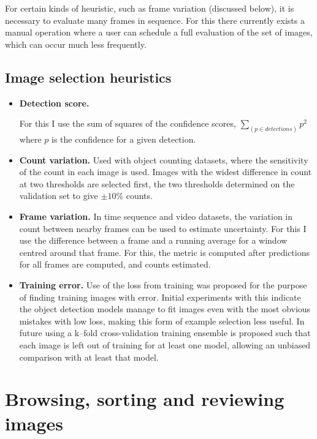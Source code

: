 For certain kinds of heuristic, such as frame variation (discussed below), it is necessary to evaluate many frames in sequence. For this there currently exists a manual operation where a user can schedule a full evaluation of the set of images, which can occur much less frequently.


\subsection {Image selection heuristics}
\begin{itemize}
\item {\bf Detection score. }

For this I use the sum of squares of the confidence scores, $ \sum_(p \in detections){ p^2 } $ where $p$ is the confidence for a given detection. 

    \item {\bf Count variation. }
Used with object counting datasets, where the sensitivity of the count in each image is used. Images with the widest difference in count at two thresholds are selected first, the two thresholds determined on the validation set to give $ \pm 10\% $ counts.
    \item {\bf Frame variation. } 
In time sequence and video datasets, the variation in count between nearby frames can be used to estimate uncertainty. For this I use the difference between a frame and a running average for a window centred around that frame. For this, the metric is computed after predictions for all frames are computed, and counts estimated.
    \item {\bf Training error. }
Use of the loss from training was proposed for the purpose of finding training images with error. Initial experiments with this indicate the object detection models manage to fit images even with the most obvious mistakes with low loss, making this form of example selection less useful. In future using a k--fold cross-validation training ensemble is proposed such that each image is left out of training for at least one model, allowing an unbiased comparison with at least that model.
\end{itemize}


\section{Browsing, sorting and reviewing images}
\label{sec:browising}



